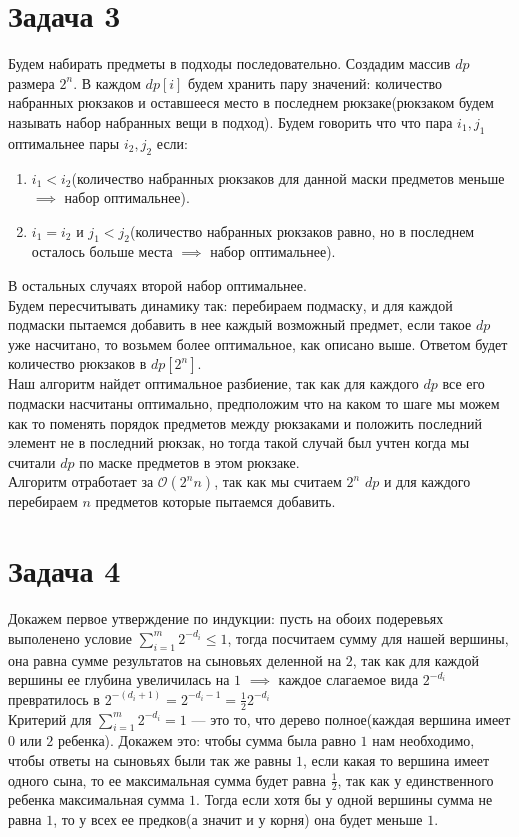 \documentclass{article}
\begin{document}
 
\noindent 
\onehalfspacing  
\section{Задача 3}
Будем набирать предметы в подходы последовательно. Создадим массив $dp$ размера $2^n$. В каждом $dp[i]$ будем хранить пару значений: количество набранных рюкзаков и оставшееся место в последнем рюкзаке(рюкзаком будем называть набор набранных вещи в подход). Будем говорить что что пара $i_1, j_1$ оптимальнее пары $i_2, j_2$ если:
\begin{enumerate}
\item $i_1 < i_2$(количество набранных рюкзаков для данной маски предметов меньше $\implies$ набор оптимальнее).
\item $i_1 = i_2$ и $j_1 < j_2$(количество набранных рюкзаков равно, но в последнем осталось больше места $\implies$ набор оптимальнее).
\end{enumerate}
В остальных случаях второй набор оптимальнее.\\
Будем пересчитывать динамику так: перебираем подмаску, и для каждой подмаски пытаемся добавить в нее каждый возможный предмет, если такое $dp$ уже насчитано, то возьмем более оптимальное, как описано выше. Ответом будет количество рюкзаков в $dp[2^{n}]$.\\
Наш алгоритм найдет оптимальное разбиение, так как для каждого $dp$ все его подмаски насчитаны оптимально, предположим что на каком то шаге мы можем как то поменять порядок предметов между рюкзаками и положить последний элемент не в последний рюкзак, но тогда такой случай был учтен когда мы считали $dp$ по маске предметов в этом рюкзаке.\\
Алгоритм отработает за $\mathcal{O}(2^{n}n)$, так как мы считаем $2^n$ $dp$ и для каждого перебираем $n$ предметов которые пытаемся добавить.
\section{Задача 4}
Докажем первое утверждение по индукции: пусть на обоих подеревьях выполенено условие $\sum\limits_{i=1}^{m}2^{-d_i}\leq 1$, тогда посчитаем сумму для нашей вершины, она равна сумме результатов на сыновьях деленной на $2$, так как для каждой вершины ее глубина увеличилась на $1$ $\implies$ каждое слагаемое вида $2^{-d_i}$ превратилось в $2^{-(d_i+1)}=2^{-d_i-1}=\frac{1}{2}2^{-d_i}$\\
Критерий для $\sum\limits_{i=1}^{m}2^{-d_i}= 1$ --- это то, что дерево полное(каждая вершина имеет $0$ или $2$ ребенка). Докажем это: чтобы сумма была равно $1$ нам необходимо, чтобы ответы на сыновьях были так же равны $1$, если какая то вершина имеет одного сына, то ее максимальная сумма будет равна $\frac{1}{2}$, так как у единственного ребенка максимальная сумма $1$. Тогда если хотя бы у одной вершины сумма не равна $1$, то у всех ее предков(а значит и у корня) она будет меньше $1$.
\end{document}
